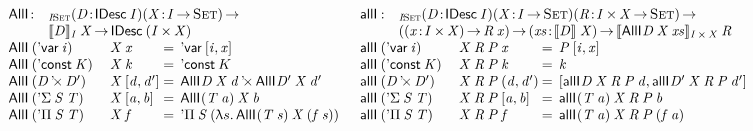\begin{figure*}

\[
\begin{array}{ll}
\stk{
\begin{array}{@{}ll}
\AllI{\!}{\!}{\!}{\!} : & _{\Bhab{\V{I}}{\Set}}
                          \PITEL{\V{D}}{\IDesc{\V{I}}}
                          \PI{\V{X}}{\V{I} \To \Set} \\
                        & \idescop{\V{D}}{\V{I}}{\V{X}} \To
                          \IDesc{(\TIMES{\V{I}}{\V{X}})}
\end{array} \\
\begin{array}{@{}ll@{\:=\:\:}l}
\AllI{\:}{(\DVar{\V{i}})}{& \V{X}}{\V{x}} &
    \DVar{\pair{\V{i}}{\V{x}}{}} \\
\AllI{\:}{(\DConst{\V{K}})}{& \V{X}}{\V{k}} &
    \DConst{K} \\
\AllI{\:}{(\DProd{\V{D}}{\V{D'}})}{& \V{X}}{\pair{\V{d}}{\V{d'}}{}} &
    \DProd{\AllI{}{\V{D}}{\V{X}}{\V{d}}}{\AllI{}{\V{D'}}{\V{X}}{\V{d'}}} \\
\AllI{\:}{(\DSigma{\V{S}}{\V{T}})}{& \V{X}}{\pair{\V{a}}{\V{b}}{}} &
    \AllI{}{(\V{T}\: \V{a})}{\V{X}}{\V{b}} \\
\AllI{\:}{(\DPi{\V{S}}{\V{T}})}{& \V{X}}{\V{f}} &
    \DPi{\V{S}}{(\LAM{s} \AllI{}{(\V{T}\: \V{s})}{\V{X}}{(\V{f}\: \V{s})})}
\end{array}
}
&
\stk{
\begin{array}{@{}ll}
\allI{\!}{\!}{\!}{\!}{\!}{\!} : & _{\Bhab{\V{I}}{\Set}}
                                  \PITEL{\V{D}}{\IDesc{\V{I}}}
                                  \PITEL{\V{X}}{\V{I} \To \Set} 
                                  \PI{\V{R}}{\TIMES{\V{I}}{\V{X}} \To \Set} \\
                                & (\PI{\V{x}}{\TIMES{\V{I}}{\V{X}}} \V{R}\: \V{x}) \To
                                  \PI{\V{xs}}{\idescop{\V{D}}{}{\V{X}}} 
                                  \idescop{\AllI{}{\V{D}}{\V{X}}{\V{xs}}}{\TIMES{\V{I}}{\V{X}}}{\V{R}}
\end{array} \\
\begin{array}{@{}ll@{\:=\:\:}l}
\allI{\:}{(\DVar{\V{i}})}{& \V{X}}{\V{R}}{\V{P}}{\V{x}} &
    \V{P}\: \pair{\V{i}}{\V{x}}{} \\
\allI{\:}{(\DConst{\V{K}})}{& \V{X}}{\V{R}}{\V{P}}{\V{k}} &
    \V{k} \\
\allI{\:}{(\DProd{\V{D}}{\V{D'}})}{& \V{X}}{\V{R}}{\V{P}}{(\V{d}, \V{d'})} &
    \pair{\allI{}{\V{D}}{\V{X}}{\V{R}}{\V{P}}{\V{d}}}
         {\allI{}{\V{D'}}{\V{X}}{\V{R}}{\V{P}}{\V{d'}}}{} \\
\allI{\:}{(\DSigma{\V{S}}{\V{T}})}{& \V{X}}{\V{R}}{\V{P}}{\pair{\V{a}}{\V{b}}{}} &
    \allI{}{(\V{T}\: \V{a})}{\V{X}}{\V{R}}{\V{P}}{\V{b}} \\
\allI{\:}{(\DPi{\V{S}}{\V{T}})}{& \V{X}}{\V{R}}{\V{P}}{\V{f}} &
    \allI{}{(\V{T}\: \V{a})}{\V{X}}{\V{R}}{\V{P}}{(\V{f}\: \V{a})}
\end{array}
\end{array}
}
\]


\end{figure*}
